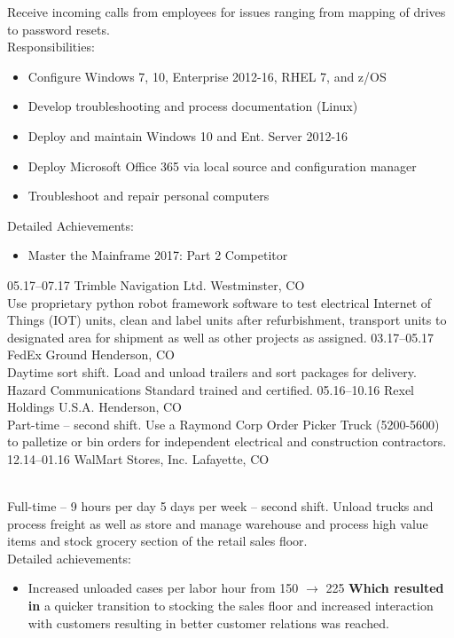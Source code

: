 \documentclass[]{cv-style}
\begin{document}
\begin{entrylist}
{  Receive incoming calls from employees for issues ranging from mapping of drives to password resets.\\
  Responsibilities:
    \begin{itemize}
  	  \item Configure Windows 7, 10, Enterprise 2012-16, RHEL 7, and z/OS
      \item Develop troubleshooting and process documentation (Linux)
      \item Deploy and maintain Windows 10 and Ent. Server 2012-16
      \item Deploy Microsoft Office 365 via local source and configuration manager
      \item Troubleshoot and repair personal computers
  \end{itemize}

  Detailed Achievements:
  \begin{itemize}
  	\item Master the Mainframe 2017: Part 2 Competitor
  \end{itemize}}
\entry
  {05.17--07.17}
  {Trimble Navigation Ltd.}
  {Westminster, CO}
  {\\
  Use proprietary python robot framework software to test electrical Internet of Things (IOT) units, clean and label units after refurbishment, transport units to designated area for shipment as well as other projects as assigned.}
\entry
  {03.17--05.17}
  {FedEx Ground}
  {Henderson, CO}
  {\\
  Daytime sort shift. Load and unload trailers and sort packages for delivery. Hazard Communications Standard trained and certified.}
\entry
  {05.16--10.16}
  {Rexel Holdings U.S.A.}
  {Henderson, CO}
  {\\
  Part-time -- second shift. Use a Raymond Corp Order Picker Truck (5200-5600) to palletize or bin orders for independent electrical and construction contractors.}
\entry
  {12.14--01.16}
  {WalMart Stores, Inc.}
  {Lafayette, CO}
  {\\
  Full-time -- 9 hours per day 5 days per week -- second shift. Unload trucks and process freight as well as store and manage warehouse and process high value items and stock grocery section of the retail sales floor.\\
  Detailed achievements:
  \begin{itemize}
    \item Increased unloaded cases per labor hour  from 150 \( \rightarrow \) 225 \textbf{Which resulted in} a quicker transition to stocking the sales floor and increased interaction with customers resulting in better customer relations was reached.
  \end{itemize}}
\end{entrylist}
\end{document}
